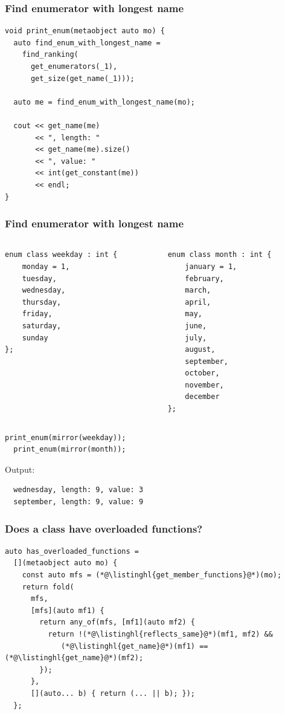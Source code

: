 \documentclass[compress,table,xcolor=table]{beamer}
\begin{document}
\begin{frame}[fragile]
  \frametitle{Find enumerator with longest name}
  \begin{lstlisting}[language=c++2x,basicstyle=\footnotesize\ttfamily]
void print_enum(metaobject auto mo) {
  auto find_enum_with_longest_name =
    find_ranking(
      get_enumerators(_1),
      get_size(get_name(_1)));

  auto me = find_enum_with_longest_name(mo);

  cout << get_name(me)
       << ", length: "
       << get_name(me).size()
       << ", value: "
       << int(get_constant(me))
       << endl;
}
  \end{lstlisting}
\end{frame}
\begin{frame}[fragile]
  \frametitle{Find enumerator with longest name}
  \begin{columns}
    \begin{column}{.45\textwidth}
      \begin{lstlisting}[language=c++2x,basicstyle=\scriptsize\ttfamily]
enum class weekday : int {
    monday = 1,
    tuesday,
    wednesday,
    thursday,
    friday,
    saturday,
    sunday
};
      \end{lstlisting}
    \end{column}
    \begin{column}{.45\textwidth}
      \begin{lstlisting}[language=c++2x,basicstyle=\tiny\ttfamily]
enum class month : int {
    january = 1,
    february,
    march,
    april,
    may,
    june,
    july,
    august,
    september,
    october,
    november,
    december
};
      \end{lstlisting}
    \end{column}
  \end{columns}
  \begin{lstlisting}[language=c++2x]
  print_enum(mirror(weekday));
  print_enum(mirror(month));
  \end{lstlisting}
  Output:
  \begin{verbatim}
  wednesday, length: 9, value: 3
  september, length: 9, value: 9
  \end{verbatim}
\end{frame}
\begin{frame}[fragile]
  \frametitle{Does a class have overloaded functions?}
  \begin{lstlisting}[language=c++2x,basicstyle=\footnotesize\ttfamily]
auto has_overloaded_functions =
  [](metaobject auto mo) {
    const auto mfs = (*@\listinghl{get_member_functions}@*)(mo);
    return fold(
      mfs,
      [mfs](auto mf1) {
        return any_of(mfs, [mf1](auto mf2) {
          return !(*@\listinghl{reflects_same}@*)(mf1, mf2) &&
             (*@\listinghl{get_name}@*)(mf1) == (*@\listinghl{get_name}@*)(mf2);
        });
      },
      [](auto... b) { return (... || b); });
  };
  \end{lstlisting}
\end{frame}
\end{document}
